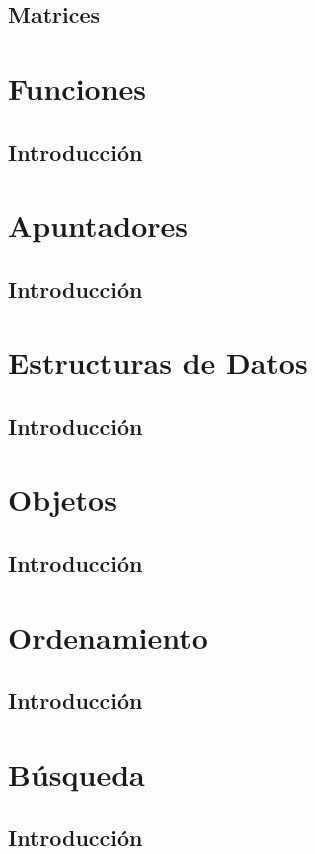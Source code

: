\documentclass{beamer}
\begin{document}
\subsection{Matrices}

\section{Funciones}
\subsection{Introducci\'on}

\section{Apuntadores}
\subsection{Introducci\'on}

\section{Estructuras de Datos}
\subsection{Introducci\'on}

\section{Objetos}
\subsection{Introducci\'on}

\section{Ordenamiento}
\subsection{Introducci\'on}

\section{B\'usqueda}
\subsection{Introducci\'on}
\end{document}
